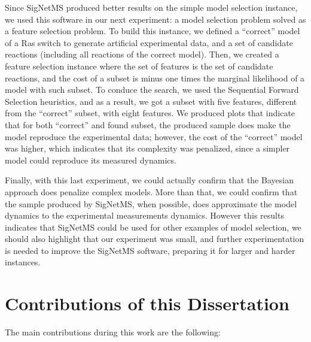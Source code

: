 Since SigNetMS produced better results on the simple model selection
instance, we used this software in our next experiment: a model
selection problem solved as a feature selection problem. To build this
instance, we defined a ``correct'' model of a Ras switch to generate
artificial experimental data, and a set of candidate reactions
(including all reactions of the correct model). Then, we created a
feature selection instance where the set of features is the set of
candidate reactions, and the cost of a subset is minus one times the
marginal likelihood of a model with such subset. To conduce the search,
we used the Sequential Forward Selection heuristics, and as a result, we
got a subset with five features, different from the ``correct'' subset,
with eight features. We produced plots that indicate that for both
``correct'' and found subset, the produced sample does make the model
reproduce the experimental data; however, the cost of the ``correct''
model was higher, which indicates that its complexity was penalized,
since a simpler model could reproduce its measured dynamics.

Finally, with this last experiment, we could actually confirm that the
Bayesian approach does penalize complex models. More than that, we could
confirm that the sample produced by SigNetMS, when possible, does
approximate the model dynamics to the experimental measurements
dynamics. However this results indicates that SigNetMS could be used for
other examples of model selection, we should also highlight that our
experiment was small, and further experimentation is needed to improve
the SigNetMS software, preparing it for larger and harder instances.

\section{Contributions of this Dissertation}
The main contributions during this work are the following:


